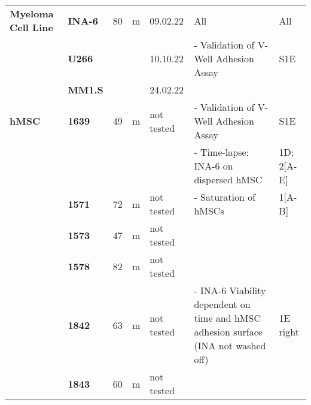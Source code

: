{\begin{longtable}{|>{\bfseries}p{1.5cm}|>{\bfseries}p{1.2cm}|p{1cm}|p{1cm}|p{2.3cm}|p{6cm}|p{1.7cm}|}
        Myeloma Cell Line & INA-6 & 80 & m & 09.02.22   & All                                                                                                      & All                                     \\
        \hhline{~------}
                          & U266  &    &   & 10.10.22   & - Validation of V-Well Adhesion Assay                                                                    & S1E                                     \\
        \hhline{~----~~}
                          & MM1.S &    &   & 24.02.22   &                                                                                                          &                                         \\
        \hline
        hMSC              & 1639  & 49 & m & not tested & - Validation of V-Well Adhesion Assay                                                                    & S1E                                     \\
        \hhline{~~~~~--}
                          &       &    &   &            & - Time-lapse: INA-6 on dispersed hMSC                                                                    & 1D; 2[A-E]                              \\
        \hhline{~------}
                          & 1571  & 72 & m & not tested & - Saturation of hMSCs                                                                                    & 1[A-B]                                  \\
        \hhline{~----~~}
                          & 1573  & 47 & m & not tested &                                                                                                          &                                         \\
        \hhline{~----~~}
                          & 1578  & 82 & m & not tested &                                                                                                          &                                         \\
        \hhline{~------}
                          & 1842  & 63 & m & not tested & - INA-6 Viability dependent on time and hMSC adhesion surface (INA not washed off)                       & 1E right                                \\
        \hhline{~----~~}
                          & 1843  & 60 & m & not tested &                                                                                                          &                                         \\

\end{longtable}}
